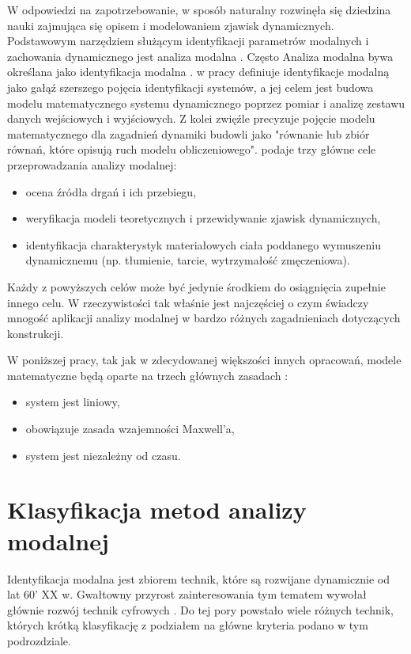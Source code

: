W odpowiedzi na zapotrzebowanie, w sposób naturalny rozwinęła się dziedzina nauki zajmująca się opisem i modelowaniem zjawisk dynamicznych. Podstawowym narzędziem służącym identyfikacji parametrów modalnych i zachowania dynamicznego jest analiza modalna . Często Analiza modalna bywa określana jako identyfikacja modalna . \parencite{Zhang2004} w pracy definiuje identyfikacje modalną jako gałąź szerszego pojęcia identyfikacji systemów, a jej celem jest budowa modelu matematycznego systemu dynamicznego poprzez pomiar i analizę zestawu danych wejściowych i wyjściowych. Z kolei \cite{Chmielewski1998} zwięźle precyzuje pojęcie modelu matematycznego dla zagadnień dynamiki budowli jako "równanie lub zbiór równań, które opisują ruch modelu obliczeniowego". \cite{Ewins2000} podaje trzy główne cele przeprowadzania analizy modalnej:
\begin{itemize}[noitemsep]
	\item ocena źródła drgań i ich przebiegu,
	\item weryfikacja modeli teoretycznych i przewidywanie zjawisk dynamicznych,
	\item identyfikacja charakterystyk materiałowych ciała poddanego wymuszeniu dynamicznemu (np. tłumienie, tarcie, wytrzymałość zmęczeniowa). 
\end{itemize}
Każdy z powyższych celów może być jedynie środkiem do osiągnięcia zupełnie innego celu. W rzeczywistości tak właśnie jest najczęściej o czym świadczy mnogość aplikacji analizy modalnej w bardzo różnych zagadnieniach dotyczących konstrukcji.

W poniższej pracy, tak jak w zdecydowanej większości innych opracowań, modele matematyczne będą oparte na trzech głównych zasadach \parencite{Maia1997}:
\begin{itemize}[noitemsep]
	\item system jest liniowy,
	\item obowiązuje zasada wzajemności Maxwell'a,
	\item system jest niezależny od czasu.
\end{itemize}


\section{Klasyfikacja metod analizy modalnej}

Identyfikacja modalna jest zbiorem technik, które są rozwijane dynamicznie od lat 60' XX w. Gwałtowny przyrost zainteresowania tym tematem wywołał głównie rozwój technik cyfrowych \parencite{Ewins2000}. Do tej pory powstało wiele różnych technik, których krótką klasyfikację z podziałem na główne kryteria podano w tym podrozdziale.

